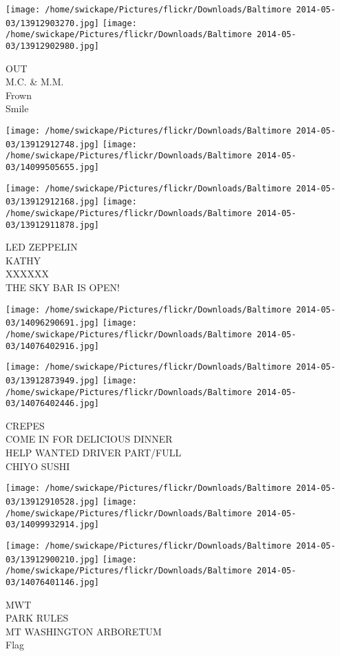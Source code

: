 \documentclass[10pt,letterpaper]{article}
\begin{document}
\texttt{[image: /home/swickape/Pictures/flickr/Downloads/Baltimore 2014-05-03/13912903270.jpg]}
\texttt{[image: /home/swickape/Pictures/flickr/Downloads/Baltimore 2014-05-03/13912902980.jpg]}

OUT\\
M.C. \& M.M.\\
Frown\\
Smile
\pagebreak

\texttt{[image: /home/swickape/Pictures/flickr/Downloads/Baltimore 2014-05-03/13912912748.jpg]}
\texttt{[image: /home/swickape/Pictures/flickr/Downloads/Baltimore 2014-05-03/14099505655.jpg]}

\texttt{[image: /home/swickape/Pictures/flickr/Downloads/Baltimore 2014-05-03/13912912168.jpg]}
\texttt{[image: /home/swickape/Pictures/flickr/Downloads/Baltimore 2014-05-03/13912911878.jpg]}

LED ZEPPELIN\\
KATHY\\
XXXXXX\\
THE SKY BAR IS OPEN!
\pagebreak

\texttt{[image: /home/swickape/Pictures/flickr/Downloads/Baltimore 2014-05-03/14096290691.jpg]}
\texttt{[image: /home/swickape/Pictures/flickr/Downloads/Baltimore 2014-05-03/14076402916.jpg]}

\texttt{[image: /home/swickape/Pictures/flickr/Downloads/Baltimore 2014-05-03/13912873949.jpg]}
\texttt{[image: /home/swickape/Pictures/flickr/Downloads/Baltimore 2014-05-03/14076402446.jpg]}

CREPES\\
COME IN FOR DELICIOUS DINNER\\
HELP WANTED DRIVER PART/FULL\\
CHIYO SUSHI
\pagebreak

\texttt{[image: /home/swickape/Pictures/flickr/Downloads/Baltimore 2014-05-03/13912910528.jpg]}
\texttt{[image: /home/swickape/Pictures/flickr/Downloads/Baltimore 2014-05-03/14099932914.jpg]}

\texttt{[image: /home/swickape/Pictures/flickr/Downloads/Baltimore 2014-05-03/13912900210.jpg]}
\texttt{[image: /home/swickape/Pictures/flickr/Downloads/Baltimore 2014-05-03/14076401146.jpg]}

MWT\\
PARK RULES\\
MT WASHINGTON ARBORETUM\\
Flag
\pagebreak
\end{document}
